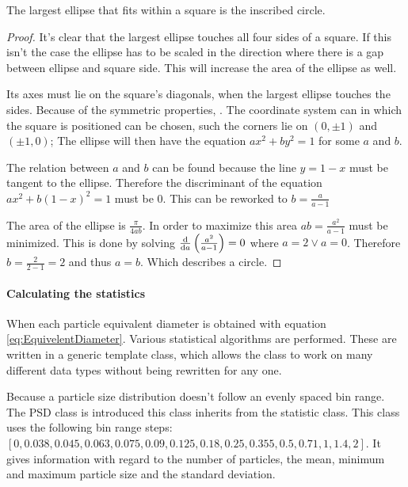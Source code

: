 \documentclass[11pt,fleqn,,a4paper,twoside,openright]{book}
\begin{document}
\begin{theorem}
	\label{theo:ellipcircle}
	The largest ellipse that fits within a square is the inscribed circle.

	\begin{proof}
		It's clear that the largest ellipse touches all four sides of a square. If this isn't the case the ellipse has to be scaled in the direction where there is a gap between ellipse and square side. This will increase the area of the ellipse as well.

		Its axes must lie on the square's diagonals, when the largest ellipse touches the sides. Because of the symmetric properties, . The coordinate system can in which the square is positioned can be chosen, such the corners lie on $ (0,\pm1) $ and $ (\pm1, 0) $; The ellipse will then have the equation $ ax^2 + by^2 = 1 $ for some $ a $ and $ b $.

		The relation between $ a $ and $ b $ can be found because the line $ y = 1 - x $ must be tangent to the ellipse. Therefore the discriminant of the equation $ ax^2 + b(1 - x)^2 = 1 $ must be 0. This can be reworked to $ b = \frac{a}{a-1}$

		The area of the ellipse is $ \frac{\pi}{4ab} $. In order to maximize this area $ ab = \frac{a^2}{a - 1} $ must be minimized. This is done by solving $ \frac{\dif}{\dif a}\left(\frac{a^2}{a - 1}\right) = 0 $ where $ a = 2 \vee a = 0 $. Therefore $ b = \frac{2}{2 - 1} = 2 $ and thus $ a = b $. Which describes a circle.
	\end{proof}

\end{theorem}

\paragraph{Calculating the statistics}
When each particle equivalent diameter is obtained with equation \ref{eq:EquivelentDiameter}. Various statistical algorithms are performed. These are written in a generic template class, which allows the class to work on many different data types without being rewritten for any one.

Because a particle size distribution doesn't follow an evenly spaced bin range. The PSD class is introduced this class inherits from the statistic class. This class uses the following bin range steps: \\ $ [0, 0.038, 0.045, 0.063, 0.075, 0.09, 0.125, 0.18, 0.25, 0.355, 0.5, 0.71, 1, 1.4, 2] $. It gives information with regard to the number of particles, the mean, minimum and maximum particle size and the standard deviation.
\end{document}
